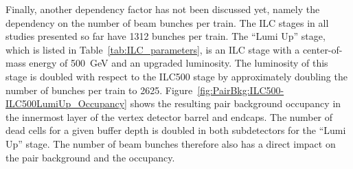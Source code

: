 Finally, another dependency factor has not been discussed yet, namely the dependency on the number of beam bunches per train.
The ILC stages in all studies presented so far have \num{1312} bunches per train.
The ``Lumi Up'' stage, which is listed in Table~\ref{tab:ILC_parameters}, is an ILC stage with a center-of-mass energy of \SI{500}{\GeV} and an upgraded luminosity.
The luminosity of this stage is doubled with respect to the ILC500 stage by approximately doubling the number of bunches per train to \num{2625}.
Figure~\ref{fig:PairBkg:ILC500-ILC500LumiUp_Occupancy} shows the resulting pair background occupancy in the innermost layer of the vertex detector barrel and endcaps.
The number of dead cells for a given buffer depth is doubled in both subdetectors for the ``Lumi Up'' stage.
The number of beam bunches therefore also has a direct impact on the pair background and the \sid occupancy.
